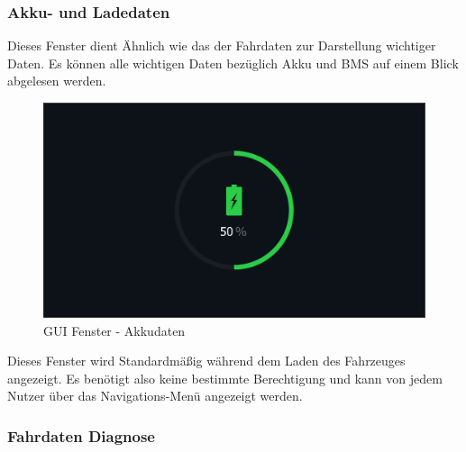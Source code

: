 \newpage

\subsubsection{Akku- und Ladedaten}

Dieses Fenster dient Ähnlich wie das der Fahrdaten zur Darstellung wichtiger Daten. Es können alle wichtigen Daten bezüglich Akku und BMS auf einem Blick abgelesen werden. 

\begin{figure}[H]
	\begin{center}
		\includegraphics[scale=0.25]{figures/hcis/window_battery.png}
			\caption{GUI Fenster - Akkudaten}
			\label{fig:pageAkku}
	\end{center}
\end{figure}

Dieses Fenster wird Standardmäßig während dem Laden des Fahrzeuges angezeigt. Es benötigt also keine bestimmte Berechtigung und kann von jedem Nutzer über das Navigations-Menü angezeigt werden.

\subsubsection{Fahrdaten Diagnose} \label{sec:diagnosis}


